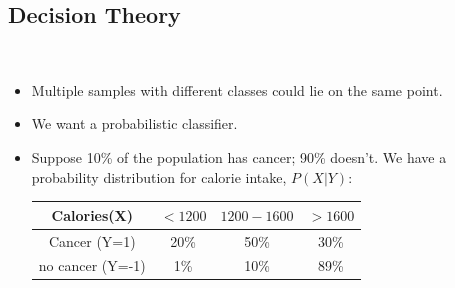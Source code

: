 \documentclass[10pt]{article}
\begin{document}
	\subsection*{Decision Theory}
	\
	\begin{itemize}
		\item Multiple samples with different classes could lie on the same point.
		\item We want a probabilistic classifier.
		\item Suppose 10\% of the population has cancer; 90\% doesn't. We have a probability distribution for calorie intake, $P(X|Y)$:
		\begin{center}
			\begin{tabular}{| c | c | c | c |}
				\hline
 				Calories(X) & $< 1200$ & $1200 - 1600$ & $> 1600$\\
 				\hline
 				Cancer (Y=1) & 20\% & 50\% & 30\%\\
 				\hline
 				no cancer (Y=-1) & 1\% & 10\% & 89\%\\
 				\hline
			\end{tabular}
		\end{center}
	

\end{itemize}
\end{document}
